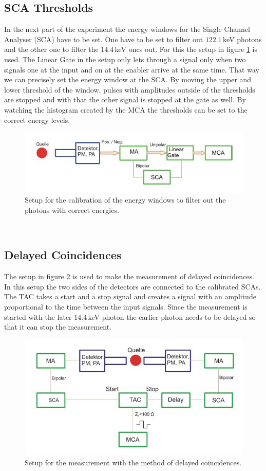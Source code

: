 \documentclass[30pt,a4paper]{article}
\begin{document}
 	\subsection{SCA Thresholds}
 	In the next part of the experiment the energy windows for the Single Channel Analyser (SCA) have to be set. One have to be set to filter out $122.1$\,keV photons and the other one to filter the $14.4$\,keV ones out. For this the setup in figure \ref{setup_EW} is used. The Linear Gate in the setup only lets through a signal only when two signals one at the input and on at the enabler arrive at the same time. That way we can precisely set the energy window at the SCA. By moving the upper and lower threshold of the window, pulses with amplitudes outside of the thresholds are stopped and with that the other signal is stopped at the gate as well. By watching the histogram created by the MCA the thresholds can be set to the correct energy levels. 
 	\begin{figure}[h]
 		\includegraphics{Bilder/Circuit_ES_calib}
 		\centering
 		\caption{\small Setup for the calibration of the energy windows to filter out the photons with correct energies.}
 		\label{setup_EW}
 	\end{figure}\\
 	\FloatBarrier
 	\subsection{Delayed Coincidences}
 	The setup in figure \ref{setup_DC} is used to make the measurement of delayed coincidences. In this setup the two sides of the detectors are connected to the calibrated SCAs. The TAC takes a start and a stop signal and creates a signal with an amplitude proportional to the time between the input signals. Since the measurement is started with the later $14.4$\,keV photon the earlier photon needs to be delayed so that it can stop the measurement.\\
 	\begin{figure}[h]
 		\includegraphics{Bilder/Circuit_DC}
 		\centering
 		\caption{\small Setup for the measurement with the method of delayed coincidences.}
 		\label{setup_DC}
 	\end{figure}\\
\end{document}
